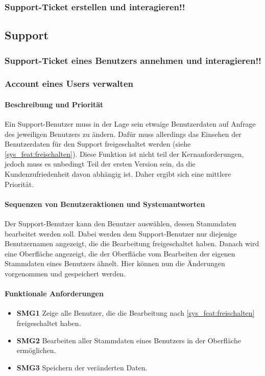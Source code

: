 \subsubsection{Support-Ticket erstellen und interagieren!!}


\subsection{Support}
\subsubsection{Support-Ticket eines Benutzers annehmen und interagieren!!}

\subsubsection{Account eines Users verwalten}
\paragraph{Beschreibung und Priorität}
Ein Support-Benutzer muss in der Lage sein etwaige Benutzerdaten auf Anfrage des jeweiligen Benutzers zu ändern. Dafür muss allerdings das Einsehen der Benutzerdaten für den Support freigeschaltet werden (siehe \ref{sys_feat:freischalten}). Diese Funktion ist nicht teil der Kernanforderungen, jedoch muss es unbedingt Teil der ersten Version sein, da die Kundenzufriedenheit davon abhängig ist. Daher ergibt sich eine mittlere Priorität.
\paragraph{Sequenzen von Benutzeraktionen und Systemantworten}
Der Support-Benutzer kann den Benutzer auswählen, dessen Stammdaten bearbeitet werden soll. Dabei werden dem Support-Benutzer nur diejenige Benutzernamen angezeigt, die die Bearbeitung freigeschaltet haben. Danach wird eine Oberfläche angezeigt, die der Oberfläche vom Bearbeiten der eigenen Stammdaten eines Benutzers ähnelt. Hier können nun die Änderungen vorgenommen und gespeichert werden.
\paragraph{Funktionale Anforderungen}
\begin{itemize}
	\item \textbf{SMG1} Zeige alle Benutzer, die die Bearbeitung nach \ref{sys_feat:freischalten} freigeschaltet haben.
	\item \textbf{SMG2} Bearbeiten aller Stammdaten eines Benutzers in der Oberfläche ermöglichen.
	\item \textbf{SMG3} Speichern der veränderten Daten.
\end{itemize}

